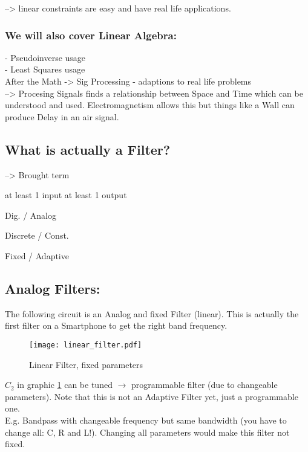 --> linear constraints are easy and have real life applications.



\subsubsection{We will also cover Linear Algebra:}
- Pseudoinverse usage \\
- Least Squares usage \\ 


After the Math -> Sig Processing - adaptions to real life problems \\

--> Procesing Signals finds a relationship between Space and Time which can be understood and used. Electromagnetism allows this but things like a Wall can produce Delay in an air signal.



\subsection{What is actually a Filter?} 

--> Brought term 

at least 1 input 
at least 1 output 

Dig. / Analog

Discrete / Const.

Fixed / Adaptive






\subsection{Analog Filters:}

The following circuit is an Analog and fixed Filter (linear). This is actually the first filter on a Smartphone to get the right band frequency. 


\begin{figure}[H]
	\centering
	\texttt{[image: linear\_filter.pdf]}
	\caption{Linear Filter, fixed parameters}
	\label{linearfilter} 
\end{figure}


$C_2$ in graphic \ref{linearfilter} can be tuned $\rightarrow$ programmable filter (due to changeable parameters). Note that this is not an Adaptive Filter yet, just a programmable one.\\
E.g. Bandpass with changeable frequency but same bandwidth (you have to change all: C, R and L!). Changing all parameters would make this filter not fixed. 


